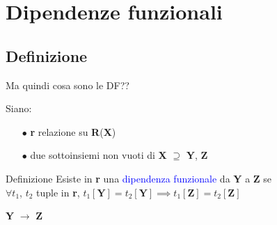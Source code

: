 \documentclass{beamer}
\begin{document}
\section{Dipendenze funzionali}


\subsection{Definizione}
\begin{frame}{Ma quindi cosa sono le DF??}

    Siano:
    \begin{itemize}
        \item[$\bullet$] \textbf{r} relazione su \textbf{R}(\textbf{X})
        \item[$\bullet$] due sottoinsiemi non vuoti di \textbf{X} $\supseteq$ \textbf{Y}, \textbf{Z}
    \end{itemize}
    
    

    \begin{block}{Definizione}
        Esiste in \textbf{r} una \textcolor{blue}{dipendenza funzionale} da \textbf{Y} a \textbf{Z} se \\
        \centering
        $\forall t_1$, $t_2$ tuple in \textbf{r}, $t_1[\textbf{Y}] = t_2[\textbf{Y}]\implies t_1[\textbf{Z}] = t_2[\textbf{Z}]$
    \end{block}

    \vfill
    \begin{center}
        \Huge
        \textbf{Y} $\rightarrow$ \textbf{Z}
    \end{center}
    \vfill
    
    
\end{frame}
\end{document}
